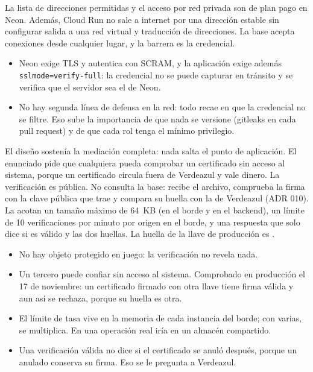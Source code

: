 \documentclass[11pt,a4paper]{article}
\theoremstyle{definition}
\theoremstyle{remark}
\newcommand{\code}[1]{\texttt{#1}}
\begin{document}
\adrctx La lista de direcciones permitidas y el acceso por red privada son de
plan pago en Neon. Además, Cloud Run no sale a internet por una dirección
estable sin configurar salida a una red virtual y traducción de direcciones.
\adrdec La base acepta conexiones desde cualquier lugar, y la barrera es la
credencial.
\adrpos
\begin{itemize}
  \item Neon exige TLS y autentica con SCRAM, y la aplicación exige además
    \code{sslmode=verify-full}: la credencial no se puede capturar en tránsito
    y se verifica que el servidor sea el de Neon.
\end{itemize}
\adrneg
\begin{itemize}
  \item No hay segunda línea de defensa en la red: todo recae en que la
    credencial no se filtre. Eso sube la importancia de que nada se versione
    (gitleaks en cada pull request) y de que cada rol tenga el mínimo
    privilegio.
\end{itemize}

\adrctx El diseño sostenía la mediación completa: nada salta el punto de
aplicación. El enunciado pide que cualquiera pueda comprobar un certificado
sin acceso al sistema, porque un certificado circula fuera de Verdeazul y
vale dinero.
\adrdec La verificación es pública. No consulta la base: recibe el archivo,
comprueba la firma con la clave pública que trae y compara su huella con la
de Verdeazul (ADR 010). La acotan un tamaño máximo de 64~KB (en el borde y en
el backend), un límite de 10 verificaciones por minuto por origen en el
borde, y una respuesta que solo dice si es válido y las dos huellas. La
huella de la llave de producción es
.
\adrpos
\begin{itemize}
  \item No hay objeto protegido en juego: la verificación no revela nada.
  \item Un tercero puede confiar sin acceso al sistema. Comprobado en
    producción el 17 de noviembre: un certificado firmado con otra llave tiene
    firma válida y aun así se rechaza, porque su huella es otra.
\end{itemize}
\adrneg
\begin{itemize}
  \item El límite de tasa vive en la memoria de cada instancia del borde; con
    varias, se multiplica. En una operación real iría en un almacén compartido.
  \item Una verificación válida no dice si el certificado se anuló después,
    porque un anulado conserva su firma. Eso se le pregunta a Verdeazul.
\end{itemize}
\end{document}

